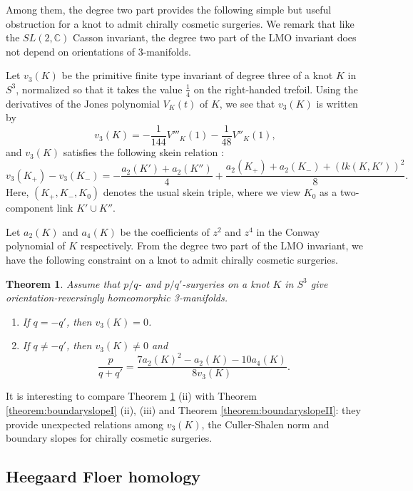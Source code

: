 \documentclass{amsart}
\newtheorem{theorem}{Theorem}[section]
\theoremstyle{remark}
\theoremstyle{definition}
\begin{document}
Among them, the degree two part provides the following simple but useful obstruction for a knot to admit chirally cosmetic surgeries.
We remark that like the $SL(2,\mathbb{C})$ Casson invariant, the degree two part of the LMO invariant does not depend on orientations of 3-manifolds.
 
Let $v_{3}(K)$ be the primitive finite type invariant of degree three of a knot $K$ in $S^3$, normalized so that it takes the value %
$\frac{1}{4}$ on the right-handed trefoil. 
Using the derivatives of the Jones polynomial $V_{K}(t)$ of $K$, we see that $v_{3}(K)$ is written by
\[ %
v_{3}(K)= -\dfrac{1}{144}V'''_{K}(1)-\frac{1}{48}V''_{K}(1), 
\]
and $v_{3}(K)$ satisfies the following skein relation \cite{IchiharaWu}: 
\[ v_{3}(K_{+})-v_{3}(K_{-})=-\frac{a_{2}(K')+a_{2}(K'')}{4}+\frac{a_{2}(K_{+})+a_{2}(K_{-})+(lk(K,K'))^{2}}{8}.\]
Here, $(K_{+},K_{-},K_{0})$ denotes the usual skein triple, where we view $K_{0}$ as a two-component link $K' \cup K''$.

Let $a_{2}(K)$ and $a_{4}(K)$ be the coefficients of $z^{2}$ and $z^{4}$ in the Conway polynomial of $K$ respectively. 
From the degree two part of the LMO invariant, we have the following constraint on  a knot to admit chirally cosmetic surgeries.



\begin{theorem}\cite[Corollary 1.3]{ItoTetsuya}
\label{theorem:v3}
Assume that $p/q$- and $p/q'$-surgeries on a knot $K$ in $S^3$ give orientation-reversingly homeomorphic 3-manifolds.
\begin{enumerate}
\item[(i)] If $q=-q'$, then $v_{3}(K)=0$.
\item[(ii)] If $q \neq -q'$, then $v_{3}(K)\neq 0$ and 
\[ \frac{p}{q+q'}= \frac{7a_{2}(K)^{2}-a_{2}(K)-10a_{4}(K)}{8v_3(K)}.\]
\end{enumerate}
\end{theorem}

It is interesting to compare Theorem \ref{theorem:v3} (ii) with Theorem \ref{theorem:boundaryslopeI} (ii), (iii) and Theorem \ref{theorem:boundaryslopeII}: 
they provide unexpected relations among $v_{3}(K)$, the Culler-Shalen norm and boundary slopes for chirally cosmetic surgeries.


\subsection{Heegaard Floer homology}
\end{document}
